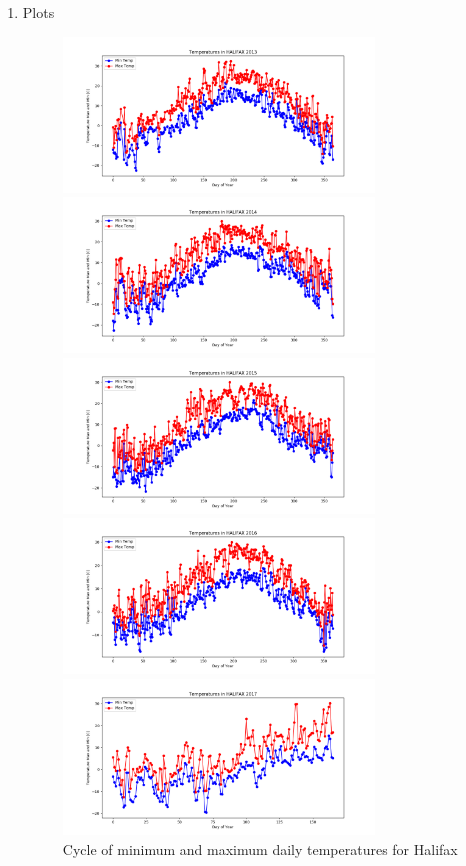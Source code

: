 \documentclass{article}
\begin{document}
\begin{enumerate}

\item  Plots 

\begin{center}
\begin{figure}[!h]
\includegraphics[width=3.25in]{../Plot/HALIFAX/day_vs_temp_2013.png}

\includegraphics[width=3.25in]{../Plot/HALIFAX/day_vs_temp_2014.png}

\includegraphics[width=3.25in]{../Plot/HALIFAX/day_vs_temp_2015.png}

\includegraphics[width=3.25in]{../Plot/HALIFAX/day_vs_temp_2016.png}

\includegraphics[width=3.25in]{../Plot/HALIFAX/day_vs_temp_2017.png}

\caption{Cycle of minimum and maximum daily temperatures for Halifax}
\label{gdd_min-max}
\end{figure}
\end{center}



\end{enumerate}
\end{document}
